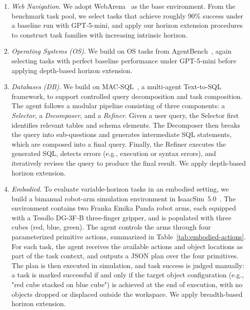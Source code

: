 \documentclass[11pt]{article}
\begin{document}
\begin{enumerate}[itemsep=0pt, topsep=2pt, parsep=0pt]
\item \textit{Web Navigation}. We adopt WebArena~\citep{zhou2023webarena} as the base environment. From the benchmark task pool, we select tasks that achieve roughly 90\% success under a baseline run with GPT-5-mini, and apply our horizon extension procedures to construct task families with increasing intrinsic horizon.

\item \textit{Operating Systems (OS)}. We build on OS tasks from AgentBench~\citep{liu2023agentbench}, again selecting tasks with perfect baseline performance under GPT-5-mini before applying depth-based horizon extension.

\item \textit{Databases (DB)}. We build on MAC-SQL~\citep{wang2025macsqlmultiagentcollaborativeframework}, a multi-agent Text-to-SQL framework, to support controlled query decomposition and task composition.
The agent follows a modular pipeline consisting of three components: a \textit{Selector}, a \textit{Decomposer}, and a \textit{Refiner}. Given a user query, the Selector first identifies relevant tables and schema elements. The Decomposer then breaks the query into sub-questions and generates intermediate SQL statements, which are composed into a final query. Finally, the Refiner executes the generated SQL, detects errors (e.g., execution or syntax errors), and iteratively revises the query to produce the final result. We apply depth-based horizon extension.

\item \textit{Embodied.} To evaluate variable-horizon tasks in an embodied setting, we build a bimanual robot-arm simulation environment in IsaacSim~5.0~\citep{kachaev2025mind}. The environment contains two Franka Emika Panda robot arms, each equipped with a Tesollo DG-3F-B three-finger gripper, and is populated with three cubes (red, blue, green). The agent controls the arms through four parameterized primitive actions, summarized in Table~\ref{tab:embodied-actions}.
For each task, the agent receives the available actions and object locations as part of the task context, and outputs a JSON plan over the four primitives. The plan is then executed in simulation, and task success is judged manually: a task is marked successful if and only if the target object configuration (e.g., "red cube stacked on blue cube") is achieved at the end of execution, with no objects dropped or displaced outside the workspace. We apply breadth-based horizon extension.


\end{enumerate}
\end{document}
